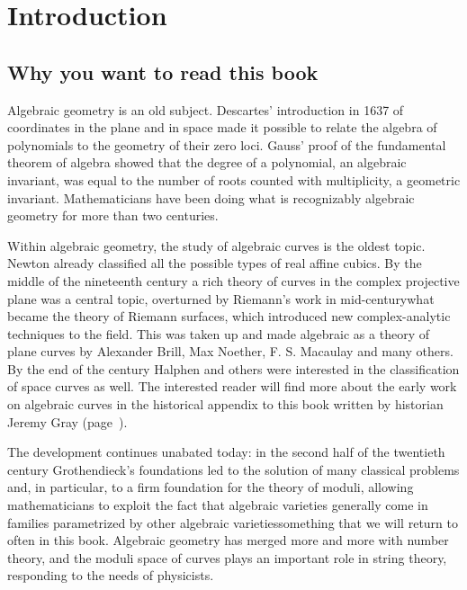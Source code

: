 
\chapter*{Introduction}
\label{IntroChapter}

\section*{Why you want to read this book}

Algebraic geometry is an old subject. 
Descartes'
%
introduction in 1637 of coordinates in the plane and in space made it
possible to relate the algebra of polynomials to the geometry of their
zero loci. 
Gauss' 
%
proof of the 
fundamental theorem of algebra
%
showed
that the degree of a polynomial, an algebraic invariant, was equal to
the number of roots counted with multiplicity, a geometric invariant.
Mathematicians have been doing what is recognizably algebraic geometry
for more than two centuries.

Within algebraic geometry, the study of algebraic curves is the oldest topic. Newton already classified all the possible types of real affine cubics. By the middle of
%
%
%
the 
nineteenth
century a rich theory of curves in the complex projective plane was a
central topic, overturned by Riemann's work in mid-century\emdash what
became the theory of Riemann surfaces, which introduced new 
complex-analytic techniques
to the field. This was  taken up and made
algebraic as a theory of plane curves by Alexander Brill, Max Noether,
F. S. Macaulay and many others. By the end of the century 
Halphen
and
others were interested in the classification of space curves as well.
The interested reader will find more about the 
%
early work on algebraic curves in the 
historical appendix to this book
written by historian Jeremy Gray
(page~\pageref{Appendix-History}).

The development continues unabated today: in the second half of the
twentieth 
century 
Grothendieck's
foundations led to the solution of many
classical problems and, in particular, to a firm foundation for the
theory of moduli, allowing mathematicians to exploit the fact that
algebraic varieties generally come in families parametrized by other
algebraic varieties\emdash something that we will return to often in
this book. Algebraic geometry has merged more and more with number
theory, and the moduli space of curves plays an important role in
string theory, responding to the needs of physicists.

